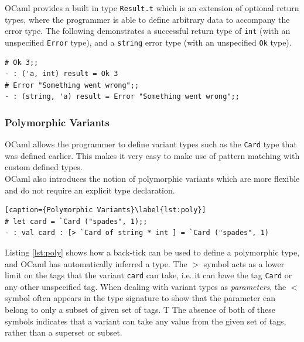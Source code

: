 \documentclass[12pt,a4paper,twoside,openright]{report}
\begin{document}
	OCaml provides a built in type \texttt{Result.t} which is an extension of optional return types, where the programmer is able to define arbitrary data to accompany the error type. 
	The following demonstrates a successful return type of \texttt{int} (with an unspecified \texttt{Error} type), and a \texttt{string} error type (with an unspecified \texttt{Ok} type).
	\begin{lstlisting}
# Ok 3;;
- : ('a, int) result = Ok 3
# Error "Something went wrong";;
- : (string, 'a) result = Error "Something went wrong";;
	\end{lstlisting} 

	\subsubsection*{Polymorphic Variants}
	OCaml allows the programmer to define variant types such as the \texttt{Card} type that was defined earlier. This makes it very easy to make use of pattern matching with custom defined types.\\
	
	OCaml also introduces the notion of polymorphic variants which are more flexible and do not require an explicit type declaration.
	\begin{lstlisting}[caption={Polymorphic Variants}\label{lst:poly}]
# let card = `Card ("spades", 1);;
- : val card : [> `Card of string * int ] = `Card ("spades", 1)
	\end{lstlisting}
	Listing \ref{lst:poly} shows how a back-tick can be used to define a polymorphic type, and OCaml has automatically inferred a type. 
	The $>$ symbol acts as a lower limit on the tags that the variant \texttt{card} can take, i.e. it can have the tag \texttt{Card} or any other unspecified tag.
	When dealing with variant types as \textit{parameters}, the $<$ symbol often appears in the type signature to show that the parameter can belong to only a subset of given set of tags. T
	The absence of both of these symbols indicates that a variant can take any value from the given set of tags, rather than a superset or subset. 
\end{document}
